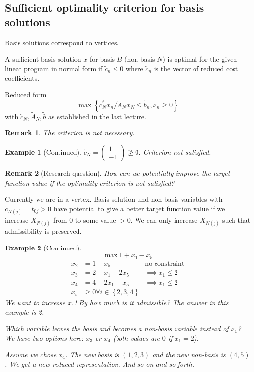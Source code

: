 \documentclass{article}
\numberwithin{lecref}{section}
\newtheorem*{Example}{Example}
\newtheorem*{Remark}{Remark}
\newcommand{\Set}[1]{\left\{#1\right\}}
\begin{document}
\subsection{Sufficient optimality criterion for basis solutions}

Basis solutions correspond to vertices.

A sufficient basis solution $x$ for basis $B$ (non-basis $N$) is optimal for the given linear program in normal form
if $\tilde c_n \leq 0$ where $\tilde c_n$ is the vector of reduced cost coefficients.

\begin{mdframed}
	Reduced form
	\[ \max\Set{\tilde c_N^t x_n / \tilde A_N x_N \leq \tilde b_n, x_n \geq 0} \]
	with $\tilde c_N, \tilde A_N, \tilde b$ as established in the last lecture.
\end{mdframed}

\begin{Remark}
	The criterion is not necessary.
\end{Remark}

\begin{Example}[Continued]
	$\tilde c_N = \begin{pmatrix} 1 \\ -1 \end{pmatrix} \not\geq 0$. Criterion not satisfied.
\end{Example}

\begin{Remark}[Research question]
	How can we potentially improve the target function value if the optimality criterion is not satisfied?
\end{Remark}

Currently we are in a vertex. Basis solution und non-basis variables with $\tilde c_{N(j)} = t_{0j} > 0$ have potential to give a better target function value if we increase $X_{N(j)}$ from 0 to some value $>0$.
We can only increase $X_{N(j)}$ such that admissibility is preserved.

\begin{Example}[Continued]
	\[ \max 1 + x_1 - x_5 \]
	\begin{align*}
		x_2 &= 1 - x_5 & \text{no constraint} \\
		x_3 &= 2 - x_1 + 2x_5 & \implies x_1 \leq 2 \\
		x_4 &= 4 - 2x_1 - x_5 & \implies x_1 \leq 2 \\
		x_i &\geq 0 \forall i \in \Set{2, 3, 4}
	\end{align*}
	We want to increase $x_1$! By how much is it admissible? The answer in this example is 2.

	Which variable leaves the basis and becomes a non-basis variable instead of $x_1$?
	We have two options here: $x_3$ or $x_4$ (both values are $0$ if $x_1 = 2$).

	Assume we chose $x_4$. The new basis is $(1, 2, 3)$ and the new non-basis is $(4,5)$. We get a new reduced representation. And so on and so forth.
\end{Example}
\end{document}
